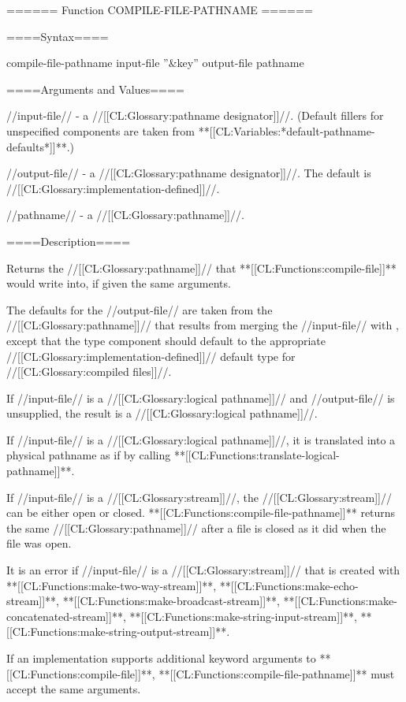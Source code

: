 ====== Function COMPILE-FILE-PATHNAME ======

====Syntax====

\DefunWithValues compile-file-pathname {input-file ''&key'' output-file {\allowotherkeys}} {pathname}

====Arguments and Values====

//input-file// - a //[[CL:Glossary:pathname designator]]//. (Default fillers for unspecified components are taken from **[[CL:Variables:*default-pathname-defaults*]]**.)

//output-file// - a //[[CL:Glossary:pathname designator]]//. The default is //[[CL:Glossary:implementation-defined]]//.

//pathname// - a //[[CL:Glossary:pathname]]//.

====Description====

Returns the //[[CL:Glossary:pathname]]// that **[[CL:Functions:compile-file]]** would write into, if given the same arguments.

The defaults for the //output-file// are taken from the //[[CL:Glossary:pathname]]// that results from merging the //input-file// with , except that the type component should default to the appropriate //[[CL:Glossary:implementation-defined]]// default type for //[[CL:Glossary:compiled files]]//.

If //input-file// is a //[[CL:Glossary:logical pathname]]// and //output-file// is unsupplied, the result is a //[[CL:Glossary:logical pathname]]//.

If //input-file// is a //[[CL:Glossary:logical pathname]]//, it is translated into a physical pathname as if by calling **[[CL:Functions:translate-logical-pathname]]**.

If //input-file// is a //[[CL:Glossary:stream]]//, the //[[CL:Glossary:stream]]// can be either open or closed. **[[CL:Functions:compile-file-pathname]]** returns the same //[[CL:Glossary:pathname]]// after a file is closed as it did when the file was open.

It is an error if //input-file// is a //[[CL:Glossary:stream]]// that is created with **[[CL:Functions:make-two-way-stream]]**, **[[CL:Functions:make-echo-stream]]**, **[[CL:Functions:make-broadcast-stream]]**, **[[CL:Functions:make-concatenated-stream]]**, **[[CL:Functions:make-string-input-stream]]**, **[[CL:Functions:make-string-output-stream]]**.

If an implementation supports additional keyword arguments to **[[CL:Functions:compile-file]]**, **[[CL:Functions:compile-file-pathname]]** must accept the same arguments.

